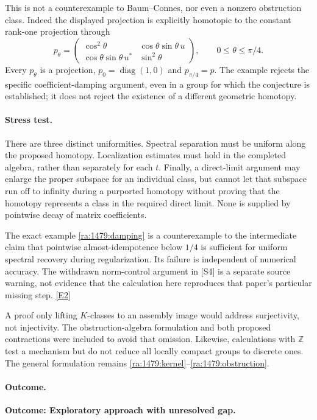\documentclass[11pt]{article}
\newcommand{\Z}{\mathbb{Z}}
\newcommand{\eref}[2]{\hyperlink{extra:#1:#2}{[E#2]}}
\begin{document}
This is not a counterexample to Baum--Connes, nor even a nonzero
obstruction class. Indeed the displayed projection is explicitly
homotopic to the constant rank-one projection through
\[
 p_\theta=
 \begin{pmatrix}
 \cos^2\theta&\cos\theta\sin\theta\,u\\
 \cos\theta\sin\theta\,u^*&\sin^2\theta
 \end{pmatrix},\qquad 0\le\theta\le\pi/4.
\]
Every $p_\theta$ is a projection, $p_0=\operatorname{diag}(1,0)$ and
$p_{\pi/4}=p$. The example rejects the specific coefficient-damping
argument, even in a group for which the conjecture is established; it
does not reject the existence of a different geometric homotopy.

\paragraph{Stress test.}
There are three distinct uniformities. Spectral separation must be
uniform along the proposed homotopy. Localization estimates must hold
in the completed algebra, rather than separately for each $t$. Finally,
a direct-limit argument may enlarge the proper subspace for an individual
class, but cannot let that subspace run off to infinity during a purported
homotopy without proving that the homotopy represents a class in the
required direct limit. None is supplied by pointwise decay of matrix
coefficients.

The exact example \eqref{ra:1479:damping} is a counterexample to the
intermediate claim that pointwise almost-idempotence below $1/4$ is
sufficient for uniform spectral recovery during regularization. Its
failure is independent of numerical accuracy. The withdrawn norm-control
argument in [S4] is a separate source warning, not evidence that the
calculation here reproduces that paper's particular missing step.
\eref{1479}{2}

A proof only lifting $K$-classes to an assembly image would address
surjectivity, not injectivity. The obstruction-algebra formulation and
both proposed contractions were included to avoid that omission.
Likewise, calculations with $\Z$ test a mechanism but do not reduce all
locally compact groups to discrete ones. The general formulation remains
\eqref{ra:1479:kernel}--\eqref{ra:1479:obstruction}.

\paragraph{Outcome.}
\textbf{Outcome: Exploratory approach with unresolved gap.}
\end{document}
